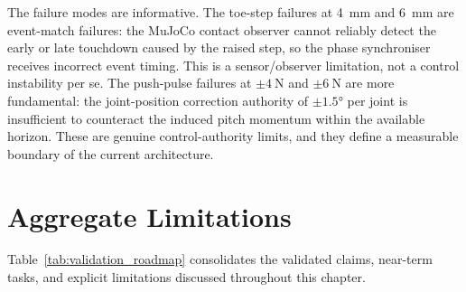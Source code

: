\documentclass[12pt,a4paper]{report}
\begin{document}
The failure modes are informative. The toe-step failures at \SI{4}{\milli\metre} and \SI{6}{\milli\metre} are event-match failures: the MuJoCo contact observer cannot reliably detect the early or late touchdown caused by the raised step, so the phase synchroniser receives incorrect event timing. This is a sensor/observer limitation, not a control instability per se. The push-pulse failures at $\pm\SI{4}{\newton}$ and $\pm\SI{6}{\newton}$ are more fundamental: the joint-position correction authority of $\pm\ang{1.5}$ per joint is insufficient to counteract the induced pitch momentum within the available horizon. These are genuine control-authority limits, and they define a measurable boundary of the current architecture.
 
\section{Aggregate Limitations}
 
Table~\ref{tab:validation_roadmap} consolidates the validated claims, near-term tasks, and explicit limitations discussed throughout this chapter.
 
\end{document}

